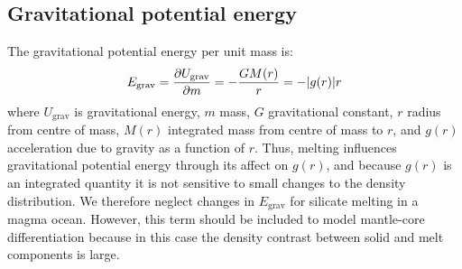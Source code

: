 \documentclass[12pt,notitlepage]{article}
\begin{document}

\subsection{Gravitational potential energy}
The gravitational potential energy per unit mass is:
\begin{equation}
E_{\rm grav} = \frac{\partial U_{\rm grav}}{\partial m} = - \frac{G M(r)}{r} = - |g(r)|r
\end{equation}
where $U_{\mathrm{grav}}$ is gravitational energy, $m$ mass, $G$ gravitational constant, $r$ radius from centre of mass, $M(r)$ integrated mass from centre of mass to $r$, and $g(r)$ acceleration due to gravity as a function of $r$.
Thus, melting influences gravitational potential energy through its affect on $g(r)$, and because $g(r)$ is an integrated quantity it is not sensitive to small changes to the density distribution.  We therefore neglect changes in $E_{\mathrm{grav}}$ for silicate melting in a magma ocean.  However, this term should be included to model mantle-core differentiation because in this case the density contrast between solid and melt components is large.
\end{document}
